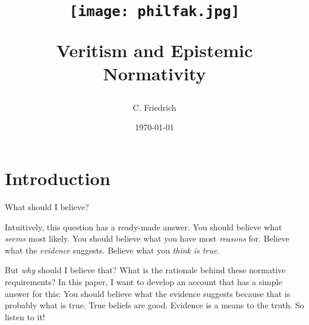 \documentclass[12pt,numbers=noenddot]{scrartcl}
\title {    \begin{center}
        \texttt{[image: philfak.jpg]}
    \end{center}
     Veritism and Epistemic Normativity }
\author{C. Friedrich}
\date{\today}
\begin{document}
\begin{titlepage}
\maketitle


\thispagestyle{empty}
\end{titlepage}

\listoftodos

\tableofcontents
\newpage

\section{Introduction}

\begin{center}
    \vspace*{2cm} 
    What should I believe?
    \vspace*{1cm} 
\end{center}

Intuitively, this question has a ready-made answer. You should believe what \emph{seems} most likely. You should believe what you have most \emph{reasons} for. Believe what the \emph{evidence} suggests. Believe what you \emph{think} \emph{is true}.

But \emph{why} should I believe that? What is the rationale behind these normative requirements? In this paper, I want to develop an account that has a simple answer for this: You should believe what the evidence suggests because that is probably what is true. True beliefs are good. Evidence is a means to the truth. So listen to it!
\end{document}

